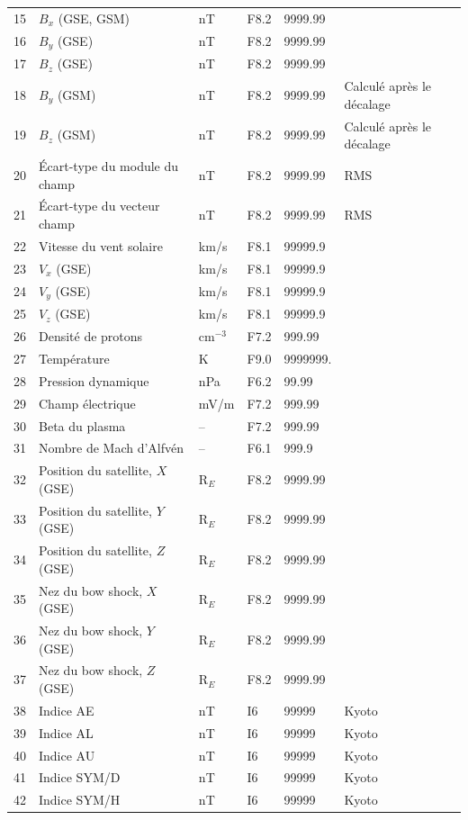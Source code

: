 \begin{longtable}{r p{5.0cm} p{2.0cm} l l p{3.3cm}}
15 & $B_x$ (GSE, GSM) & nT & F8.2 & 9999.99 & \\
16 & $B_y$ (GSE) & nT & F8.2 & 9999.99 & \\
17 & $B_z$ (GSE) & nT & F8.2 & 9999.99 & \\
18 & $B_y$ (GSM) & nT & F8.2 & 9999.99 & Calculé après le décalage \\
19 & $B_z$ (GSM) & nT & F8.2 & 9999.99 & Calculé après le décalage \\
20 & Écart-type du module du champ & nT & F8.2 & 9999.99 & RMS \\
21 & Écart-type du vecteur champ & nT & F8.2 & 9999.99 & RMS \\
22 & Vitesse du vent solaire & km/s & F8.1 & 99999.9 & \\
23 & $V_x$ (GSE) & km/s & F8.1 & 99999.9 & \\
24 & $V_y$ (GSE) & km/s & F8.1 & 99999.9 & \\
25 & $V_z$ (GSE) & km/s & F8.1 & 99999.9 & \\
26 & Densité de protons & cm$^{-3}$ & F7.2 & 999.99 & \\
27 & Température & K & F9.0 & 9999999. & \\
28 & Pression dynamique & nPa & F6.2 & 99.99 & \\
29 & Champ électrique & mV/m & F7.2 & 999.99 & \\
30 & Beta du plasma & -- & F7.2 & 999.99 & \\
31 & Nombre de Mach d'Alfvén & -- & F6.1 & 999.9 & \\
32 & Position du satellite, $X$ (GSE) & R$_E$ & F8.2 & 9999.99 & \\
33 & Position du satellite, $Y$ (GSE) & R$_E$ & F8.2 & 9999.99 & \\
34 & Position du satellite, $Z$ (GSE) & R$_E$ & F8.2 & 9999.99 & \\
35 & Nez du bow shock, $X$ (GSE) & R$_E$ & F8.2 & 9999.99 & \\
36 & Nez du bow shock, $Y$ (GSE) & R$_E$ & F8.2 & 9999.99 & \\
37 & Nez du bow shock, $Z$ (GSE) & R$_E$ & F8.2 & 9999.99 & \\
38 & Indice AE & nT & I6 & 99999 & Kyoto \\
39 & Indice AL & nT & I6 & 99999 & Kyoto \\
40 & Indice AU & nT & I6 & 99999 & Kyoto \\
41 & Indice SYM/D & nT & I6 & 99999 & Kyoto \\
42 & Indice SYM/H & nT & I6 & 99999 & Kyoto \\

\end{longtable}

